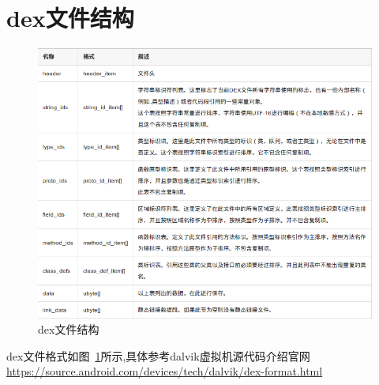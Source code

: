 \section{dex文件结构}

\begin{figure}[hbpt]
\centering
\includegraphics[width=\textwidth]{img/dex.png}
\caption{dex文件结构}
\label{fig:dex}
\end{figure}

dex文件格式如图~\ref{fig:dex}所示,具体参考dalvik虚拟机源代码介绍官网\url{https://source.android.com/devices/tech/dalvik/dex-format.html}

